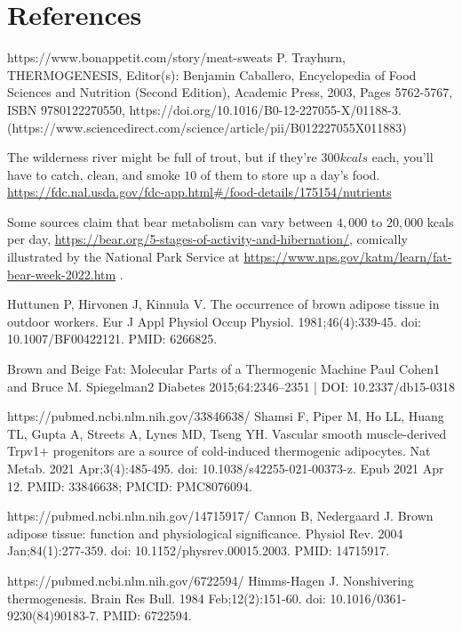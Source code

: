 \documentclass[12pt]{iopart}
\begin{document}
\section*{References}
\begin{thebibliography}{99}

https://www.bonappetit.com/story/meat-sweats
P. Trayhurn,
THERMOGENESIS,
Editor(s): Benjamin Caballero,
Encyclopedia of Food Sciences and Nutrition (Second Edition),
Academic Press,
2003,
Pages 5762-5767,
ISBN 9780122270550,
https://doi.org/10.1016/B0-12-227055-X/01188-3.
(https://www.sciencedirect.com/science/article/pii/B012227055X011883)

The wilderness river might be full of trout, but if they're $300kcals$ each, you'll have to catch, clean, and smoke $10$ of them to store up a day's food. \url{https://fdc.nal.usda.gov/fdc-app.html#/food-details/175154/nutrients}

Some sources claim that bear metabolism can vary between $4,000$ to $20,000$ kcals per day, \url{https://bear.org/5-stages-of-activity-and-hibernation/}, comically illustrated by the National Park Service at \url{https://www.nps.gov/katm/learn/fat-bear-week-2022.htm} .
  
Huttunen P, Hirvonen J, Kinnula V. The occurrence of brown adipose tissue in outdoor workers. Eur J Appl Physiol Occup Physiol. 1981;46(4):339-45. doi: 10.1007/BF00422121. PMID: 6266825.

Brown and Beige Fat: Molecular Parts of a Thermogenic Machine
Paul Cohen1 and Bruce M. Spiegelman2
Diabetes 2015;64:2346–2351 | DOI: 10.2337/db15-0318

https://pubmed.ncbi.nlm.nih.gov/33846638/
Shamsi F, Piper M, Ho LL, Huang TL, Gupta A, Streets A, Lynes MD, Tseng YH. Vascular smooth muscle-derived Trpv1+ progenitors are a source of cold-induced thermogenic adipocytes. Nat Metab. 2021 Apr;3(4):485-495. doi: 10.1038/s42255-021-00373-z. Epub 2021 Apr 12. PMID: 33846638; PMCID: PMC8076094.

https://pubmed.ncbi.nlm.nih.gov/14715917/
Cannon B, Nedergaard J. Brown adipose tissue: function and physiological significance. Physiol Rev. 2004 Jan;84(1):277-359. doi: 10.1152/physrev.00015.2003. PMID: 14715917.

https://pubmed.ncbi.nlm.nih.gov/6722594/
Himms-Hagen J. Nonshivering thermogenesis. Brain Res Bull. 1984 Feb;12(2):151-60. doi: 10.1016/0361-9230(84)90183-7. PMID: 6722594.


\end{thebibliography}
\end{document}
